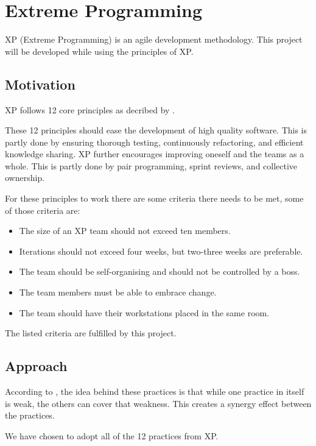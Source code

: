 \section{Extreme Programming}
XP (Extreme Programming) is an agile development methodology. This project will be developed while using the principles of XP.

\subsection{Motivation}
XP follows 12 core principles as decribed by \citet[p. 54]{xp:explained}.

These 12 principles should ease the development of high quality software.
This is partly done by ensuring thorough testing, continuously refactoring, and efficient knowledge sharing.
XP further encourages improving oneself and the teams as a whole.
This is partly done by pair programming, sprint reviews, and collective ownership.

For these principles to work there are some criteria there needs to be met, some of those criteria are:
\begin{itemize}
\item The size of an XP team should not exceed ten members.
\item Iterations should not exceed four weeks, but two-three weeks are preferable.
\item The team should be self-organising and should not be controlled by a boss.
\item The team members must be able to embrace change.
\item The team should have their workstations placed in the same room.
\end{itemize}

The listed criteria are fulfilled by this project.

\subsection{Approach}
According to \citet[p. 53]{xp:explained}, the idea behind these practices is that while one practice in itself is weak, the others can cover that weakness. This creates a synergy effect between the practices. %

We have chosen to adopt all of the 12 practices from XP. 

